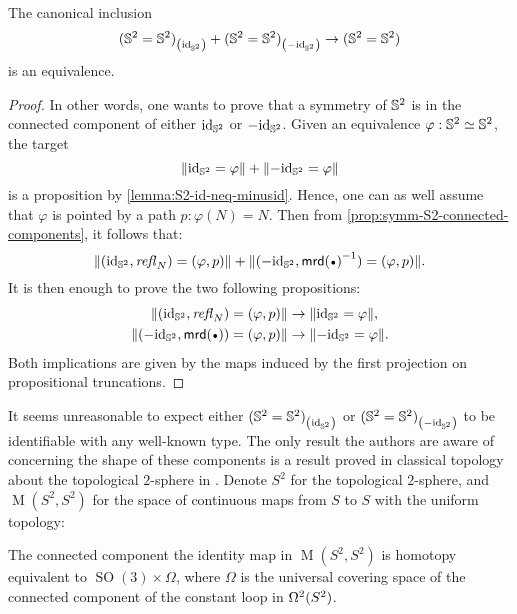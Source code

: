 \documentclass[english,a4]{article}
\begin{document}
\begin{proposition}
  The canonical inclusion
  \begin{displaymath}
    {({{\mathbb S^{2}}}= {{\mathbb S^{2}}})}_{\left(\mathord{\mathrm{id}}_{{\mathbb S^{2}}}\right)} + {({{\mathbb S^{2}}} = {{\mathbb S^{2}}})}_{\left(-\mathord{\mathrm{id}}_{{\mathbb S^{2}}}\right)} \to ({{\mathbb S^{2}}} = {{\mathbb S^{2}}})
  \end{displaymath}
  is an equivalence.
  \label{prop:symm-S2-connected-components}
\end{proposition}
\begin{proof}
  In other words, one wants to prove that a symmetry of ${{\mathbb S^{2}}}$ is in the
  connected component of either $\mathord{\mathrm{id}}_{{\mathbb S^{2}}}$ or $-\mathord{\mathrm{id}}_{{\mathbb S^{2}}}$. Given an equivalence
  $\varphi:{{\mathbb S^{2}}} \simeq {{\mathbb S^{2}}}$, the target 
  \begin{displaymath}
    \lVert\mathord{\mathrm{id}}_{{\mathbb S^{2}}} = \varphi\rVert + \lVert-\mathord{\mathrm{id}}_{{\mathbb S^{2}}} = \varphi\rVert
  \end{displaymath}
  is a proposition by \cref{lemma:S2-id-neq-minusid}. Hence, one can as well
  assume that $\varphi$ is pointed by a path $p:\varphi(N) = N$. Then from
  \cref{prop:symm-S2-connected-components}, it follows that:
  \begin{displaymath}
    \Trunc{(\id_\Sp,\refl N) = (\varphi, p)} + \Trunc{(-\id_\Sp,\inv{\mrd(\base)}) = (\varphi, p)}.
  \end{displaymath}
  It is then enough to prove the two following propositions:
  \begin{align*}
    \Trunc{(\id_\Sp,\refl N) = (\varphi, p)} &\to \Trunc{\id_\Sp = \varphi},
    \\
    \Trunc{(-\id_\Sp,\mrd(\base)) = (\varphi, p)} &\to \Trunc{-\id_\Sp = \varphi}.
  \end{align*}
  Both implications are given by the maps induced by the first projection on
  propositional truncations.
\end{proof}

It seems unreasonable to expect either ${({{\mathbb S^{2}}} = {{\mathbb S^{2}}})}_{\left(\mathord{\mathrm{id}}_{{\mathbb S^{2}}}\right)}$ or
${({{\mathbb S^{2}}} = {{\mathbb S^{2}}})}_{\left(-\mathord{\mathrm{id}}_{{\mathbb S^{2}}}\right)}$ to be identifiable with any well-known type.
%
\newcommand{\topSp}{S^2}%
The only result the authors are aware of concerning the shape of these
components is a result proved in classical topology about the topological
$2$-sphere in \cite[Thm.~4.1]{hansen}. Denote $\topSp$ for the topological
$2$-sphere, and $\operatorname M(\topSp,\topSp)$ for the space of continuous
maps from $S$ to $S$ with the uniform topology:
\begin{theorem}
  The connected component the identity map in $\operatorname M(\topSp,\topSp)$
  is homotopy equivalent to $\operatorname{SO}(3)\times \Omega$, where $\Omega$
  is the universal covering space of the connected component of the constant
  loop in $\loopspace 2 (\topSp)$.
  \label{thm:hansen}
\end{theorem}
\end{document}
